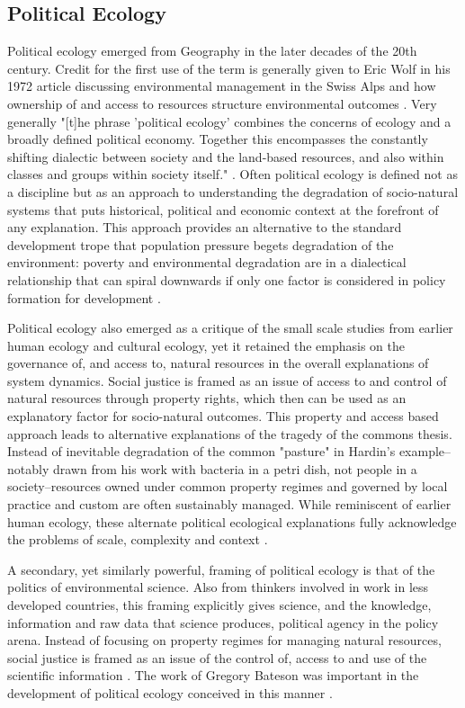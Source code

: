\subsection{Political Ecology}

Political ecology emerged from Geography in the later decades of the 20th century. Credit for the first use of the term is generally given to Eric Wolf in his 1972 article discussing environmental management in the Swiss Alps and how ownership of and access to resources structure environmental outcomes \citep{wolf_1972}. Very generally "[t]he phrase 'political ecology' combines the concerns of ecology and a broadly defined political economy. Together this encompasses the constantly shifting dialectic between society and the land-based resources, and also within classes and groups within society itself." \citep[][p. 17]{blaikie_1987}. Often political ecology is defined not as a discipline but as an approach to understanding the degradation of socio-natural systems that puts historical, political and economic context at the forefront of any explanation. This approach provides an alternative to the standard development trope that population pressure begets degradation of the environment: poverty and environmental degradation are in a dialectical relationship that can spiral downwards if only one factor is considered in policy formation for development \citep{blaikie_1987, peet_1996}.

Political ecology also emerged as a critique of the small scale studies from earlier human ecology and cultural ecology, yet it retained the emphasis on the governance of, and access to, natural resources in the overall explanations of system dynamics. Social justice is framed as an issue of access to and control of natural resources  through property rights, which then can be used as an explanatory factor for socio-natural outcomes. This property and access based approach leads to alternative explanations of the tragedy of the commons thesis. Instead of inevitable degradation of the common "pasture" in Hardin's example--notably drawn from his work with bacteria in a petri dish, not people in a society--resources owned under common property regimes and governed by local practice and custom are often sustainably managed. While reminiscent of earlier human ecology, these alternate political ecological explanations fully acknowledge the problems of scale, complexity and context \citep{ostrom_1999}. 

A secondary, yet similarly powerful, framing of political ecology is that of the politics of environmental science. Also from thinkers involved in work in less developed countries, this framing explicitly gives science, and the knowledge, information and raw data that science produces, political agency in the policy arena. Instead of focusing on property regimes for managing natural resources, social justice is framed as an issue of the control of, access to and use of the scientific information \citep{forsyth_2003,leach_1996}. The work of Gregory Bateson was important in the development of political ecology conceived in this manner \citep{peet_1996}.

